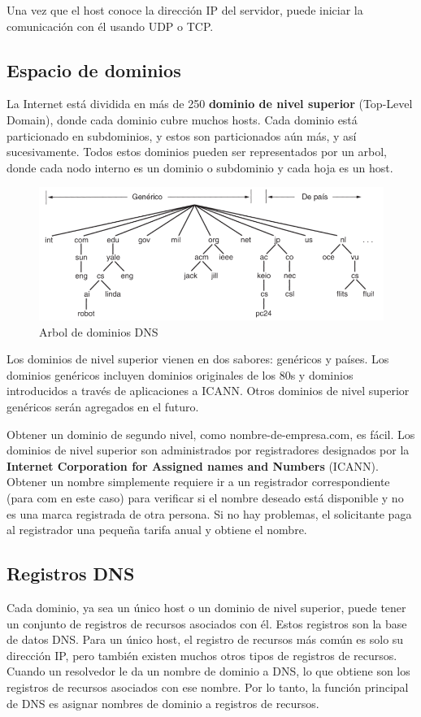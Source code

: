 Una vez que el host conoce la dirección IP del servidor, puede iniciar la comunicación con él usando UDP o TCP.

\subsection{Espacio de dominios}
La Internet está dividida en más de 250 \textbf{dominio de nivel superior} (Top-Level Domain), donde cada dominio cubre muchos hosts. Cada dominio está particionado en subdominios, y estos son particionados aún más, y así sucesivamente. Todos estos dominios pueden ser representados por un arbol, donde cada nodo interno es un dominio o subdominio y cada hoja es un host.

\begin{figure}[H]
	\centering
	\includegraphics[width=\textwidth
]{images/dns-tree.png}
	\caption[Arbol de dominios DNS]{Arbol de dominios DNS}
	\label{fig:dns-tree}
\end{figure}

Los dominios de nivel superior vienen en dos sabores: genéricos y países.  Los dominios genéricos incluyen dominios originales de los 80s y dominios introducidos a través de aplicaciones a ICANN. Otros dominios de nivel superior genéricos serán agregados en el futuro.

Obtener un dominio de segundo nivel, como nombre-de-empresa.com, es fácil. Los dominios de nivel superior son administrados por registradores designados por la \textbf{Internet Corporation for Assigned  names and Numbers} (ICANN). Obtener un nombre simplemente requiere ir a un registrador correspondiente (para com en este caso) para verificar si el nombre deseado está disponible y no es una marca registrada de otra persona. Si no hay problemas, el solicitante paga al registrador una pequeña tarifa anual y obtiene el nombre.

\subsection{Registros DNS}
Cada dominio, ya sea un único host o un dominio de nivel superior, puede tener un conjunto de registros de recursos asociados con él. Estos registros son la base de datos DNS. Para un único host, el registro de recursos más común es solo su dirección IP, pero también existen muchos otros tipos de registros de recursos. Cuando un resolvedor le da un nombre de dominio a DNS, lo que obtiene son los registros de recursos asociados con ese nombre. Por lo tanto, la función principal de DNS es asignar nombres de dominio a registros de recursos.

